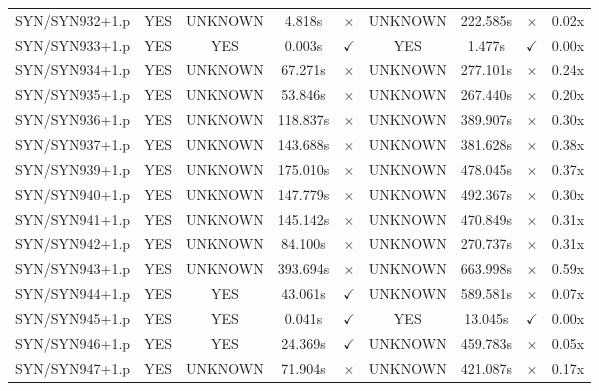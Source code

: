 \documentclass[a4paper,10pt]{article}
\begin{document}
\begin{longtable}{lcccccccc}
SYN/SYN932+1.p & YES & UNKNOWN & 4.818s & \cellcolor{mismatchcolor}$\times$ & UNKNOWN & 222.585s & \cellcolor{mismatchcolor}$\times$ & 0.02x \\
SYN/SYN933+1.p & YES & YES & 0.003s & \cellcolor{matchcolor}$\checkmark$ & YES & 1.477s & \cellcolor{matchcolor}$\checkmark$ & 0.00x \\
SYN/SYN934+1.p & YES & UNKNOWN & 67.271s & \cellcolor{mismatchcolor}$\times$ & UNKNOWN & 277.101s & \cellcolor{mismatchcolor}$\times$ & 0.24x \\
SYN/SYN935+1.p & YES & UNKNOWN & 53.846s & \cellcolor{mismatchcolor}$\times$ & UNKNOWN & 267.440s & \cellcolor{mismatchcolor}$\times$ & 0.20x \\
SYN/SYN936+1.p & YES & UNKNOWN & 118.837s & \cellcolor{mismatchcolor}$\times$ & UNKNOWN & 389.907s & \cellcolor{mismatchcolor}$\times$ & 0.30x \\
SYN/SYN937+1.p & YES & UNKNOWN & 143.688s & \cellcolor{mismatchcolor}$\times$ & UNKNOWN & 381.628s & \cellcolor{mismatchcolor}$\times$ & 0.38x \\
SYN/SYN939+1.p & YES & UNKNOWN & 175.010s & \cellcolor{mismatchcolor}$\times$ & UNKNOWN & 478.045s & \cellcolor{mismatchcolor}$\times$ & 0.37x \\
SYN/SYN940+1.p & YES & UNKNOWN & 147.779s & \cellcolor{mismatchcolor}$\times$ & UNKNOWN & 492.367s & \cellcolor{mismatchcolor}$\times$ & 0.30x \\
SYN/SYN941+1.p & YES & UNKNOWN & 145.142s & \cellcolor{mismatchcolor}$\times$ & UNKNOWN & 470.849s & \cellcolor{mismatchcolor}$\times$ & 0.31x \\
SYN/SYN942+1.p & YES & UNKNOWN & 84.100s & \cellcolor{mismatchcolor}$\times$ & UNKNOWN & 270.737s & \cellcolor{mismatchcolor}$\times$ & 0.31x \\
SYN/SYN943+1.p & YES & UNKNOWN & 393.694s & \cellcolor{mismatchcolor}$\times$ & UNKNOWN & 663.998s & \cellcolor{mismatchcolor}$\times$ & 0.59x \\
SYN/SYN944+1.p & YES & YES & 43.061s & \cellcolor{matchcolor}$\checkmark$ & UNKNOWN & 589.581s & \cellcolor{mismatchcolor}$\times$ & 0.07x \\
SYN/SYN945+1.p & YES & YES & 0.041s & \cellcolor{matchcolor}$\checkmark$ & YES & 13.045s & \cellcolor{matchcolor}$\checkmark$ & 0.00x \\
SYN/SYN946+1.p & YES & YES & 24.369s & \cellcolor{matchcolor}$\checkmark$ & UNKNOWN & 459.783s & \cellcolor{mismatchcolor}$\times$ & 0.05x \\
SYN/SYN947+1.p & YES & UNKNOWN & 71.904s & \cellcolor{mismatchcolor}$\times$ & UNKNOWN & 421.087s & \cellcolor{mismatchcolor}$\times$ & 0.17x \\

\end{longtable}
\end{document}
